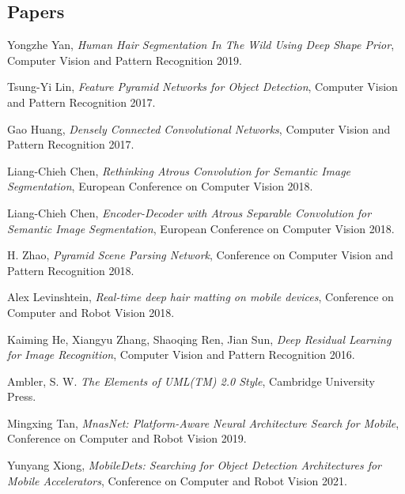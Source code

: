 
\begin{thebibliography}{9}
\section*{Papers}

Yongzhe Yan,
\textit{Human Hair Segmentation In The Wild Using Deep Shape Prior}, Computer Vision and Pattern Recognition 2019.

Tsung-Yi Lin,
\textit{Feature Pyramid Networks for Object Detection}, Computer Vision and Pattern Recognition 2017.

Gao Huang,
\textit{Densely Connected Convolutional Networks}, Computer Vision and Pattern Recognition 2017.

Liang-Chieh Chen,
\textit{Rethinking Atrous Convolution for Semantic Image Segmentation}, European Conference on Computer Vision 2018.

Liang-Chieh Chen,
\textit{Encoder-Decoder with Atrous Separable Convolution for Semantic Image Segmentation}, European Conference on Computer Vision 2018.

H. Zhao,
\textit{Pyramid Scene Parsing Network}, Conference on Computer Vision and Pattern Recognition 2018.

Alex Levinshtein,
\textit{Real-time deep hair matting on mobile devices}, Conference on Computer and Robot Vision 2018.

Kaiming He, Xiangyu Zhang, Shaoqing Ren, Jian Sun,
\textit{Deep Residual Learning for Image Recognition},
Computer Vision and Pattern Recognition 2016.

Ambler, S. W.
\textit{The Elements of UML(TM) 2.0 Style}, Cambridge University Press.

Mingxing Tan,
\textit{MnasNet: Platform-Aware Neural Architecture Search for Mobile}, Conference on Computer and Robot Vision 2019.

Yunyang Xiong,
\textit{MobileDets: Searching for Object Detection Architectures for Mobile
Accelerators}, Conference on Computer and Robot Vision 2021.


\end{thebibliography}
